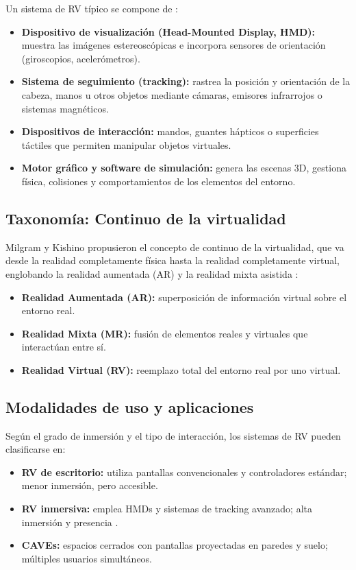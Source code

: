 Un sistema de RV típico se compone de \cite{sherman2002,burdea2003}:
\begin{itemize}
  \item \textbf{Dispositivo de visualización (Head-Mounted Display, HMD):} muestra las imágenes estereoscópicas e incorpora sensores de orientación (giroscopios, acelerómetros).
  \item \textbf{Sistema de seguimiento (tracking):} rastrea la posición y orientación de la cabeza, manos u otros objetos mediante cámaras, emisores infrarrojos o sistemas magnéticos.
  \item \textbf{Dispositivos de interacción:} mandos, guantes hápticos o superficies táctiles que permiten manipular objetos virtuales.
  \item \textbf{Motor gráfico y software de simulación:} genera las escenas 3D, gestiona física, colisiones y comportamientos de los elementos del entorno.
\end{itemize}

\subsection{Taxonomía: Continuo de la virtualidad}

Milgram y Kishino propusieron el concepto de continuo de la virtualidad, que va desde la realidad completamente física hasta la realidad completamente virtual, englobando la realidad aumentada (AR) y la realidad mixta asistida \cite{milgram94}:
\begin{itemize}
  \item \textbf{Realidad Aumentada (AR):} superposición de información virtual sobre el entorno real.
  \item \textbf{Realidad Mixta (MR):} fusión de elementos reales y virtuales que interactúan entre sí.
  \item \textbf{Realidad Virtual (RV):} reemplazo total del entorno real por uno virtual.
\end{itemize}

\subsection{Modalidades de uso y aplicaciones}

Según el grado de inmersión y el tipo de interacción, los sistemas de RV pueden clasificarse en:
\begin{itemize}
  \item \textbf{RV de escritorio:} utiliza pantallas convencionales y controladores estándar; menor inmersión, pero accesible.
  \item \textbf{RV inmersiva:} emplea HMDs y sistemas de tracking avanzado; alta inmersión y presencia \cite{burdea2003}.
  \item \textbf{CAVEs:} espacios cerrados con pantallas proyectadas en paredes y suelo; múltiples usuarios simultáneos.
\end{itemize}

